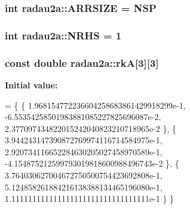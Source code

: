 \subsubsection[{\texorpdfstring{A\+R\+R\+S\+I\+ZE}{ARRSIZE}}]{\setlength{\rightskip}{0pt plus 5cm}int radau2a\+::\+A\+R\+R\+S\+I\+ZE = N\+SP\hspace{0.3cm}{\ttfamily [static]}}\hypertarget{namespaceradau2a_ad00dd88322d09c410e8e5b9af87af14c}{}\label{namespaceradau2a_ad00dd88322d09c410e8e5b9af87af14c}
\subsubsection[{\texorpdfstring{N\+R\+HS}{NRHS}}]{\setlength{\rightskip}{0pt plus 5cm}int radau2a\+::\+N\+R\+HS = 1\hspace{0.3cm}{\ttfamily [static]}}\hypertarget{namespaceradau2a_a67ae7402ff0a6a919cfc653405f513e0}{}\label{namespaceradau2a_a67ae7402ff0a6a919cfc653405f513e0}
\subsubsection[{\texorpdfstring{rkA}{rkA}}]{\setlength{\rightskip}{0pt plus 5cm}const double radau2a\+::rkA\mbox{[}3\mbox{]}\mbox{[}3\mbox{]}\hspace{0.3cm}{\ttfamily [static]}}\hypertarget{namespaceradau2a_a37314d1d93d3f053f469c40c5d42a43e}{}\label{namespaceradau2a_a37314d1d93d3f053f469c40c5d42a43e}
{\bfseries Initial value\+:}
\begin{DoxyCode}
= \{ \{
     1.968154772236604258683861429918299e-1,
    -6.55354258501983881085227825696087e-2,
     2.377097434822015242040823210718965e-2
    \}, \{
     3.944243147390872769974116714584975e-1,
     2.920734116652284630205027458970589e-1,
    -4.154875212599793019818600988496743e-2
    \}, \{
     3.764030627004672750500754423692808e-1,
     5.124858261884216138388134465196080e-1,
     1.111111111111111111111111111111111e-1
    \}
\}
\end{DoxyCode}
